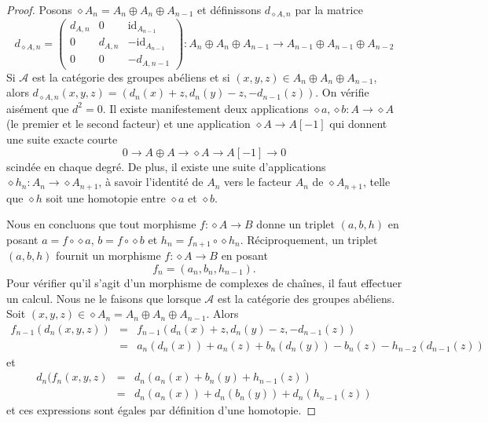 \begin{proof}
Posons $\diamond A_n = A_n \oplus A_n \oplus A_{n - 1}$ et
définissons $d_{\diamond A, n}$ par la matrice
$$
d_{\diamond A, n}
=
\left(
\begin{matrix}
d_{A, n} & 0 & \text{id}_{A_{n - 1}} \\
0 & d_{A, n} & -\text{id}_{A_{n - 1}} \\
0 & 0 & -d_{A, n - 1}
\end{matrix}
\right) :
A_n \oplus A_n \oplus A_{n - 1} \to
A_{n - 1} \oplus A_{n - 1} \oplus A_{n - 2}
$$
Si $\mathcal{A}$ est la catégorie des groupes abéliens et si
$(x, y, z) \in A_n \oplus A_n \oplus A_{n - 1}$, alors
$d_{\diamond A, n}(x, y, z) = (d_n(x) + z, d_n(y) - z, -d_{n - 1}(z))$.
On vérifie aisément que $d^2 = 0$. Il existe manifestement deux applications
$\diamond a, \diamond b : A \to \diamond A$ (le premier et le second facteur)
et une application $\diamond A \to A[-1]$ qui donnent une suite exacte courte
$$
0 \to
A \oplus A \to
\diamond A \to
A[-1] \to
0
$$
scindée en chaque degré. De plus, il existe une suite d'applications
$\diamond h_n : A_n \to \diamond A_{n + 1}$, à savoir l'identité de $A_n$
vers le facteur $A_n$ de $\diamond A_{n + 1}$, telle que $\diamond h$ soit
une homotopie entre $\diamond a$ et $\diamond b$.

\medskip\noindent
Nous en concluons que tout morphisme $f : \diamond A \to B$ donne un triplet
$(a, b, h)$ en posant $a = f \circ \diamond a$,
$b = f \circ \diamond b$ et $h_n = f_{n + 1} \circ \diamond h_n$.
Réciproquement, un triplet $(a, b, h)$ fournit un morphisme
$f : \diamond A \to B$ en posant
$$
f_n = (a_n, b_n, h_{n - 1}).
$$
Pour vérifier qu'il s'agit d'un morphisme de complexes de chaînes, il faut
effectuer un calcul. Nous ne le faisons que lorsque $\mathcal{A}$ est la
catégorie des groupes abéliens. Soit
$(x, y, z) \in \diamond A_n = A_n \oplus A_n \oplus A_{n - 1}$. Alors
\begin{eqnarray*}
f_{n - 1}(d_n(x, y, z)) & = &
f_{n - 1}(d_n(x) + z, d_n(y) - z, -d_{n - 1}(z)) \\
& = &
a_n(d_n(x)) + a_n(z) + b_n(d_n(y)) - b_n(z) - h_{n - 2}(d_{n - 1}(z))
\end{eqnarray*}
et
\begin{eqnarray*}
d_n(f_n(x, y, z) & = &
d_n(a_n(x) + b_n(y) + h_{n - 1}(z)) \\
& = &
d_n(a_n(x)) + d_n(b_n(y)) + d_n(h_{n - 1}(z))
\end{eqnarray*}
et ces expressions sont égales par définition d'une homotopie.
\end{proof}

